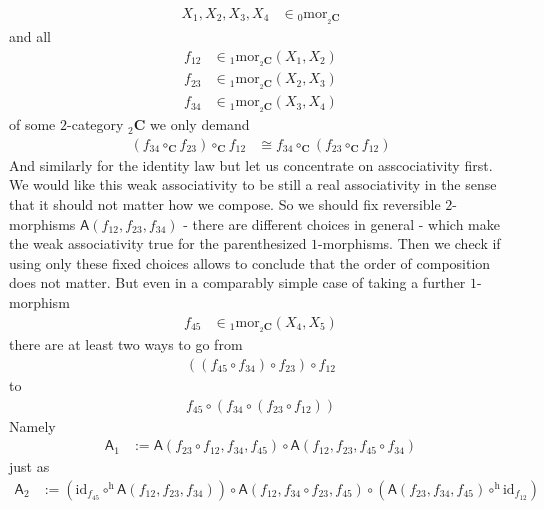 \begin{align*}
  X_{1},X_{2},X_{3},X_{4}
  &\in
  {}_{0}\mathrm{mor}_{{}_{2}\mathbf{C}}
\end{align*}
and all
\begin{align*}
  f_{12}
  &\in
  {}_{1}\mathrm{mor}_{{}_{2}\mathbf{C}}(X_{1},X_{2})
  \\
  f_{23}
  &\in
  {}_{1}\mathrm{mor}_{{}_{2}\mathbf{C}}(X_{2},X_{3})
  \\
  f_{34}
  &\in
  {}_{1}\mathrm{mor}_{{}_{2}\mathbf{C}}(X_{3},X_{4})
\end{align*}
of some $2$-category ${}_{2}\mathbf{C}$ we only demand
\begin{align*}
  \left(
    f_{34}
    \circ_{\mathbf{C}}
    f_{23}
  \right)
  \circ_{\mathbf{C}}
  f_{12}
  &\cong
  f_{34}
  \circ_{\mathbf{C}}
  \left(
    f_{23}
    \circ_{\mathbf{C}}
    f_{12}
  \right)
\end{align*}
And similarly for the identity law but let us concentrate on asscociativity first. We would like this weak associativity to be still a real associativity in the sense that it should not matter how we compose. So we should fix reversible $2$-morphisms $\mathsf{A}(f_{12},f_{23},f_{34})$ - there are different choices in general - which make the weak associativity true for the parenthesized $1$-morphisms. Then we check if using only these fixed choices allows to conclude that the order of composition does not matter. But even in a comparably simple case of taking a further $1$-morphism
\begin{align*}
  f_{45}
  &\in
  {}_{1}\mathrm{mor}_{{}_{2}\mathbf{C}}(X_{4},X_{5})
\end{align*}
there are at least two ways to go from
\begin{align*}
  \left(
    \left(
      f_{45}
      \circ
      f_{34}
    \right)
    \circ
    f_{23}
  \right)
  \circ
  f_{12}
\end{align*}
to
\begin{align*}
  f_{45}
  \circ
  \left(
    f_{34}
    \circ
    \left(
      f_{23}
      \circ
      f_{12}
    \right)
  \right)
\end{align*}
Namely
\begin{align*}
  \mathsf{A}_{1}
  &:=
  \mathsf{A}(f_{23} \circ f_{12},f_{34},f_{45})
  \circ
  \mathsf{A}(f_{12},f_{23},f_{45} \circ f_{34})
\end{align*}
just as
\begin{align*}
  \mathsf{A}_{2}
  &:=
  \left(
    \mathrm{id}_{f_{45}}
    \circ^{\textrm{h}}
    \mathsf{A}(f_{12},f_{23},f_{34})
  \right)
  \circ
  \mathsf{A}(f_{12},f_{34} \circ f_{23},f_{45})
  \circ
  \left(
    \mathsf{A}(f_{23},f_{34},f_{45})
    \circ^{\textrm{h}}
    \mathrm{id}_{f_{12}}
  \right)
\end{align*}

